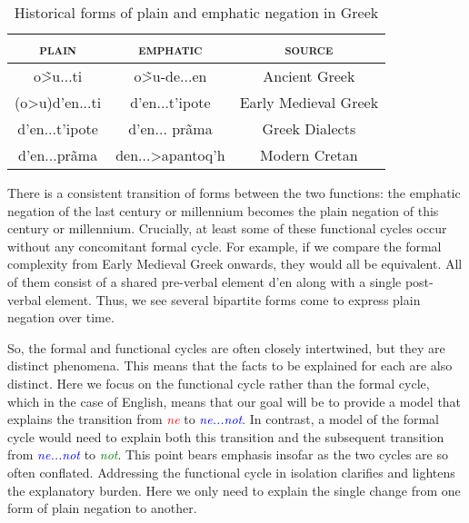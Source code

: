 \documentclass[linguex]{sp}
\theoremstyle{definition} \newtheorem{definition}{Definition}
\begin{document}
\begin{table}
    \begin{center}
    \begin{tabular}{@{}ccc@{}}
      \hline
      \textsc{plain} & \textsc{emphatic} & \textsc{source} \\
      \hline
      \textgreek{o\~>u...ti} & \textgreek{o\~>u-de...en} & Ancient Greek \\
      \textgreek{(o>u)d'en...ti} & \textgreek{d'en...t'ipote} & Early Medieval Greek \\
      \textgreek{d'en...t'ipote} & \textgreek{d'en... pr\~ama} & Greek Dialects \\
      \textgreek{d'en...pr\~ama} & \textgreek{den...>apantoq'h} & Modern Cretan \\
      \hline
    \end{tabular}
    \end{center}
    \caption{Historical forms of plain and emphatic negation in Greek}
    \label{greek-table}
\end{table}
There is a consistent transition of forms between the two functions: the emphatic negation of the last century or millennium becomes the plain negation of this century or millennium. Crucially, at least some of these functional cycles occur without any concomitant formal cycle.  For example, if we compare the formal complexity from Early Medieval Greek onwards, they would all be equivalent. All of them consist of a shared pre-verbal element \textgreek{d'en} along with a single post-verbal element. Thus, we see several bipartite forms come to express plain negation over time.

So, the formal and functional cycles are often closely intertwined, but they are distinct phenomena. This means that the facts to be explained for each are also distinct.  Here we focus on the functional cycle rather than the formal cycle, which in the case of English, means that our goal will be to provide a model that explains the transition from \emph{\textcolor{red}{ne}} to \emph{\textcolor{blue}{ne...not}}. In contrast, a model of the formal cycle would need to explain both this transition and the subsequent transition from \emph{\textcolor{blue}{ne...not}}  to  \emph{\textcolor{green}{not}}. This point bears emphasis insofar as the two cycles are so often conflated. Addressing the functional cycle in isolation clarifies and lightens the explanatory burden. Here we only need to explain the single change from one form of plain negation to another.
\end{document}
